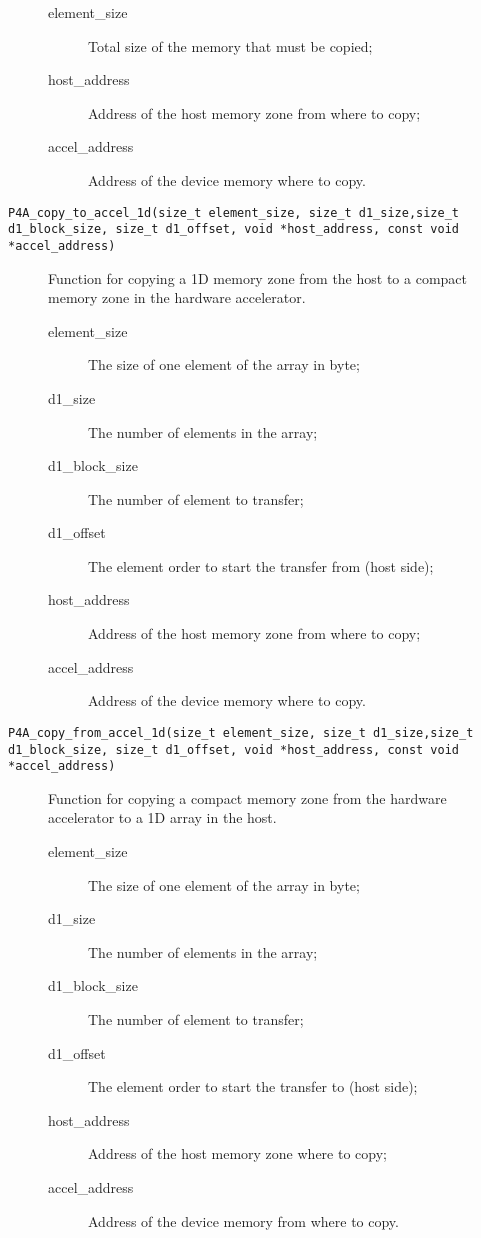 \documentclass[a4paper]{article}
\begin{document}
\begin{description}
  \begin{description}
  \item[element\_size] Total size of the memory that must be copied;
  \item[host\_address] Address of the host memory zone from where to copy;
  \item[accel\_address] Address of the device memory where to copy.
  \end{description}



\item[\texttt{P4A\_copy\_to\_accel\_1d(size\_t element\_size, size\_t
    d1\_size,size\_t d1\_block\_size, size\_t d1\_offset, void
    *host\_address, const void *accel\_address)}] Function for copying
  a 1D memory zone from the host to a compact memory zone in the
  hardware accelerator.

  \begin{description}
  \item[element\_size] The size of one element of the array in byte;
  \item[d1\_size] The number of elements in the array;
  \item[d1\_block\_size] The number of element to transfer;
  \item[d1\_offset] The element order to start the transfer from (host
    side);
  \item[host\_address] Address of the host memory zone from where to copy;
  \item[accel\_address] Address of the device memory where to copy.
  \end{description}


\item[\texttt{P4A\_copy\_from\_accel\_1d(size\_t element\_size,
    size\_t d1\_size,size\_t d1\_block\_size, size\_t d1\_offset, void
    *host\_address, const void *accel\_address)}] Function for copying
  a compact memory zone from the hardware accelerator to a 1D array in the
  host.

  \begin{description}
  \item[element\_size] The size of one element of the array in byte;
  \item[d1\_size] The number of elements in the array;
  \item[d1\_block\_size] The number of element to transfer;
  \item[d1\_offset] The element order to start the transfer to (host
    side);
  \item[host\_address] Address of the host memory zone where to copy;
  \item[accel\_address] Address of the device memory from where to copy.
  \end{description}



\end{description}
\end{document}
